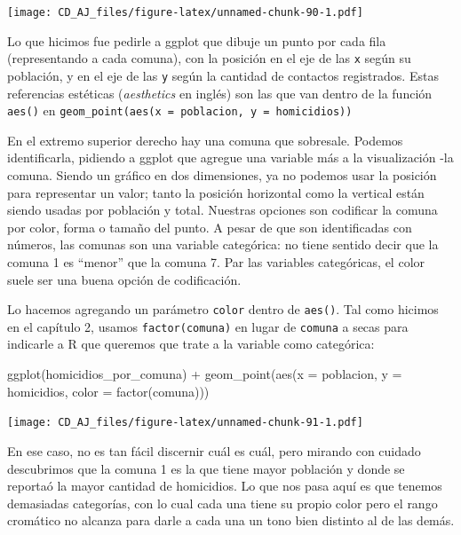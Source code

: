 \documentclass[
]{book}
\newenvironment{Shaded}{\begin{snugshade}}{\end{snugshade}}
\newcommand{\AttributeTok}[1]{\textcolor[rgb]{0.77,0.63,0.00}{#1}}
\newcommand{\FunctionTok}[1]{\textcolor[rgb]{0.00,0.00,0.00}{#1}}
\newcommand{\NormalTok}[1]{#1}
\newcommand{\SpecialCharTok}[1]{\textcolor[rgb]{0.00,0.00,0.00}{#1}}
\begin{document}
\texttt{[image: CD\_AJ\_files/figure-latex/unnamed-chunk-90-1.pdf]}

Lo que hicimos fue pedirle a ggplot que dibuje un punto por cada fila (representando a cada comuna), con la posición en el eje de las \texttt{x} según su población, y en el eje de las \texttt{y} según la cantidad de contactos registrados. Estas referencias estéticas (\emph{aesthetics} en inglés) son las que van dentro de la función \texttt{aes()} en \texttt{geom\_point(aes(x\ =\ poblacion,\ y\ =\ homicidios))}

En el extremo superior derecho hay una comuna que sobresale. Podemos identificarla, pidiendo a ggplot que agregue una variable más a la visualización -la comuna. Siendo un gráfico en dos dimensiones, ya no podemos usar la posición para representar un valor; tanto la posición horizontal como la vertical están siendo usadas por población y total. Nuestras opciones son codificar la comuna por color, forma o tamaño del punto. A pesar de que son identificadas con números, las comunas son una variable categórica: no tiene sentido decir que la comuna 1 es ``menor'' que la comuna 7. Par las variables categóricas, el color suele ser una buena opción de codificación.

Lo hacemos agregando un parámetro \texttt{color} dentro de \texttt{aes()}. Tal como hicimos en el capítulo 2, usamos \texttt{factor(comuna)} en lugar de \texttt{comuna} a secas para indicarle a R que queremos que trate a la variable como categórica:

\begin{Shaded}
\begin{Highlighting}[]
\FunctionTok{ggplot}\NormalTok{(homicidios\_por\_comuna) }\SpecialCharTok{+} 
    \FunctionTok{geom\_point}\NormalTok{(}\FunctionTok{aes}\NormalTok{(}\AttributeTok{x =}\NormalTok{ poblacion, }\AttributeTok{y =}\NormalTok{ homicidios, }\AttributeTok{color =} \FunctionTok{factor}\NormalTok{(comuna)))}
\end{Highlighting}
\end{Shaded}

\texttt{[image: CD\_AJ\_files/figure-latex/unnamed-chunk-91-1.pdf]}

En ese caso, no es tan fácil discernir cuál es cuál, pero mirando con cuidado descubrimos que la comuna 1 es la que tiene mayor población y donde se reportaó la mayor cantidad de homicidios. Lo que nos pasa aquí es que tenemos demasiadas categorías, con lo cual cada una tiene su propio color pero el rango cromático no alcanza para darle a cada una un tono bien distinto al de las demás.
\end{document}
